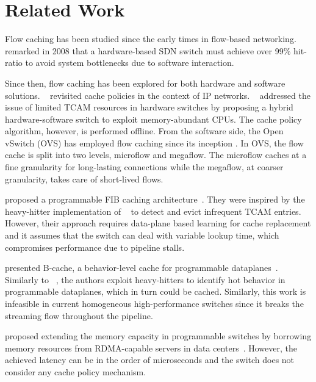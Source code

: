 \section{Related Work}\label{sec:related_works}

Flow caching has been studied since the early times in flow-based networking.
\citeauthor{casado:2008}~\cite{casado:2008} remarked in 2008 that a hardware-based SDN switch must achieve over 99\% hit-ratio to avoid system bottlenecks due to software interaction.

Since then, flow caching has been explored for both hardware and software solutions.
\citeauthor{Kim:09}~\cite{Kim:09} revisited cache policies in the context of IP networks.
\citeauthor{Katta:2014}~\cite{Katta:2014,Katta:2016} addressed the issue of limited TCAM resources in hardware switches by proposing a hybrid hardware-software switch to exploit memory-abundant CPUs.
The cache policy algorithm, however, is performed offline. 
From the software side, the Open vSwitch (OVS) has employed flow caching since its inception \cite{Pfaff:15}.
In OVS, the flow cache is split into two levels, microflow and megaflow.
The microflow caches at a fine granularity for long-lasting connections while the megaflow, at coarser granularity, takes care of short-lived flows.

\citeauthor{Grigoryan:18} proposed a programmable FIB caching architecture~\cite{Grigoryan:18}.
They were inspired by the heavy-hitter implementation of \citeauthor{Sivaraman:17}~\cite{Sivaraman:17} to detect and evict infrequent TCAM entries.
However, their approach requires data-plane based learning for cache replacement and it assumes that the switch can deal with variable lookup time, which compromises performance due to pipeline stalls. 

\citeauthor{Zhang:2018} presented B-cache, a behavior-level cache for programmable dataplanes~\cite{Zhang:2018}. Similarly to \citeauthor{Grigoryan:18}~\cite{Grigoryan:18}, the authors exploit heavy-hitters to identify hot behavior in programmable dataplanes, which in turn could be cached. Similarly, this work is infeasible in current homogeneous high-performance switches since it breaks the streaming flow throughout the pipeline.

\citeauthor{Kim:2018} proposed extending the memory capacity in programmable switches by borrowing memory resources from RDMA-capable servers in data centers~\cite{Kim:2018}. However, the achieved latency can be in the order of microseconds and the switch does not consider any cache policy mechanism.

